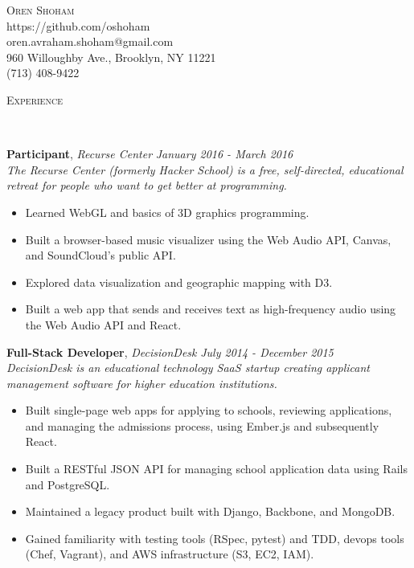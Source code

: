 \documentclass[9pt]{article}
\newenvironment{changemargin}[2]{%
  \begin{list}{}{%
    \setlength{\topsep}{0pt}%
    \setlength{\leftmargin}{#1}%
    \setlength{\rightmargin}{#2}%
    \setlength{\listparindent}{\parindent}%
    \setlength{\itemindent}{\parindent}%
    \setlength{\parsep}{\parskip}%
  }%
  \item[]}{\end{list}
}
\newcommand{\lineover}{
	\begin{changemargin}{-0.05in}{-0.05in}
		\vspace*{-8pt}
		\hrulefill \\
		\vspace*{-2pt}
	\end{changemargin}
}
\newcommand{\header}[1]{
	\begin{changemargin}{-0.5in}{-0.5in}
		\scshape{#1}\\
  	\lineover
	\end{changemargin}
}
\newcommand{\contact}[5]{
	\begin{changemargin}{-0.5in}{-0.5in}
		\begin{center}
			{\Large \scshape {#1}}\\ \smallskip
			{#2}\\ \smallskip 
			{#3}\\ \smallskip
			{#4}\\ \smallskip
			{#5}\smallskip
		\end{center}
	\end{changemargin}
}
\newenvironment{body} {
	\vspace*{-16pt}
	\begin{changemargin}{-0.25in}{-0.5in}
  }	
	{\end{changemargin}
}
\begin{document}

\contact{Oren Shoham}{https://github.com/oshoham}{oren.avraham.shoham@gmail.com}{960 Willoughby Ave., Brooklyn, NY 11221}{(713) 408-9422}



\header{Experience}

\begin{body}
	\vspace{14pt}

	\textbf{Participant}, \emph{Recurse Center} \hfill  \emph{January 2016 - March 2016}\\
	\emph{The Recurse Center (formerly Hacker School) is a free, self-directed, educational retreat for people who want to get better at programming.}
	\vspace*{-4pt}
	\begin{itemize} \itemsep -0pt  %
		\item Learned WebGL and basics of 3D graphics programming.
		\item Built a browser-based music visualizer using the Web Audio API, Canvas, and SoundCloud's public API.
		\item Explored data visualization and geographic mapping with D3.
		\item Built a web app that sends and receives text as high-frequency audio using the Web Audio API and React.
	\end{itemize}

	\textbf{Full-Stack Developer}, \emph{DecisionDesk} \hfill \emph{July 2014 - December 2015}\\
	\emph{DecisionDesk is an educational technology SaaS startup creating applicant management software for higher education institutions.}
	\vspace*{-4pt}
	\begin{itemize} \itemsep -0pt  %
		\item Built single-page web apps for applying to schools, reviewing applications, and managing the admissions process, using Ember.js and subsequently React.
		\item Built a RESTful JSON API for managing school application data using Rails and PostgreSQL.
		\item Maintained a legacy product built with Django, Backbone, and MongoDB.
		\item Gained familiarity with testing tools (RSpec, pytest) and TDD, devops tools (Chef, Vagrant),  and AWS infrastructure (S3, EC2, IAM).
	\end{itemize}


\end{body}
\end{document}
